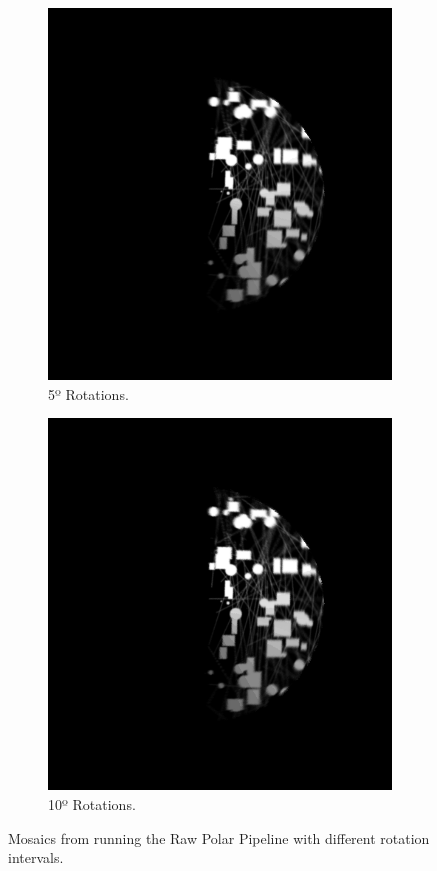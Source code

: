 \begin{figure}[H]
\begin{subfigure}[b]{.48\textwidth}
        \includegraphics[height=\textwidth]{figures/results/Rotation-Combined/PC-5.png}
        \caption{5º Rotations.}
    \end{subfigure}
    \hfill
    \begin{subfigure}[b]{.48\textwidth}
        \centering
        \includegraphics[height=\textwidth]{figures/results/Rotation-Combined/PC-10.png}
        \caption{10º Rotations.}
    \end{subfigure}
    \hfill
    \caption{Mosaics from running the Raw Polar Pipeline with different rotation intervals.}
    \label{fig:pcmosaic}
\end{figure}

